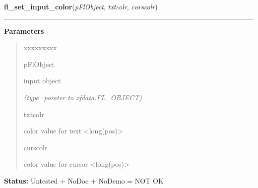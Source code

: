     \label{xformslib:flinput:fl_set_input_color}

    \vspace{0.5ex}

\hspace{.8\funcindent}\begin{boxedminipage}{\funcwidth}

    \raggedright \textbf{fl\_set\_input\_color}(\textit{pFlObject}, \textit{txtcolr}, \textit{curscolr})

    \vspace{-1.5ex}

    \rule{\textwidth}{0.5\fboxrule}
\setlength{\parskip}{2ex}
\setlength{\parskip}{1ex}
      \textbf{Parameters}
      \vspace{-1ex}

      \begin{quote}
        \begin{Ventry}{xxxxxxxxx}

          \item[pFlObject]

          input object

            {\it (type=pointer to xfdata.FL\_OBJECT)}

          \item[txtcolr]

          color value for text {\textless}long(pos){\textgreater}

          \item[curscolr]

          color value for cursor {\textless}long(pos){\textgreater}

        \end{Ventry}

      \end{quote}

\textbf{Status:} Untested + NoDoc + NoDemo = NOT OK



    \end{boxedminipage}

    \label{xformslib:flinput:fl_get_input_color}

    \vspace{0.5ex}

